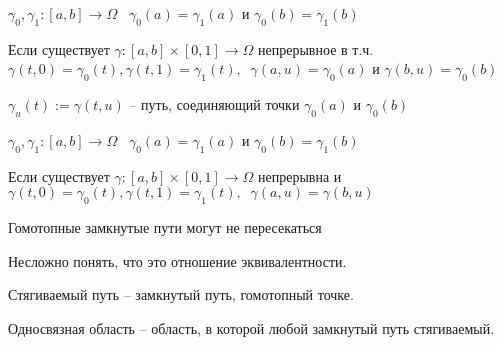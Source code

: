 
\begin{definition}\thmslashn
	
	$\gamma_0, \gamma_1:[a,b]\to \Omega \;\;\; \gamma_0(a) = \gamma_1(a)$ и $\gamma_0(b) = \gamma_1(b)$
	
	Если существует $\gamma:[a, b] \times [0, 1] \to \Omega$ непрерывное в т.ч. $\gamma(t, 0) = \gamma_0(t), \gamma(t, 1) = \gamma_1(t), \;\;\gamma(a, u) = \gamma_0(a)$ и $\gamma(b, u) = \gamma_0(b)$
	
	$\gamma_u(t):= \gamma(t, u)$ -- путь, соединяющий точки $\gamma_0(a)$ и $\gamma_0(b)$
	
\end{definition}

\begin{definition}\thmslashn
	
	$\gamma_0, \gamma_1:[a,b]\to \Omega \;\;\; \gamma_0(a) = \gamma_1(a)$ и $\gamma_0(b) = \gamma_1(b)$
	
	Если существует $\gamma:[a, b] \times [0, 1] \to \Omega$ непрерывна и $\gamma(t, 0) = \gamma_0(t), \gamma(t, 1) = \gamma_1(t), \;\;\gamma(a, u) = \gamma(b, u)$
	
\end{definition}

\begin{remark_author}
	Гомотопные замкнутые пути могут не пересекаться
\end{remark_author}

Несложно понять, что это отношение эквивалентности.

\begin{definition}
	Стягиваемый путь -- замкнутый путь, гомотопный точке.
\end{definition}

\begin{definition}
	Односвязная область -- область, в которой любой замкнутый путь стягиваемый.
\end{definition}

